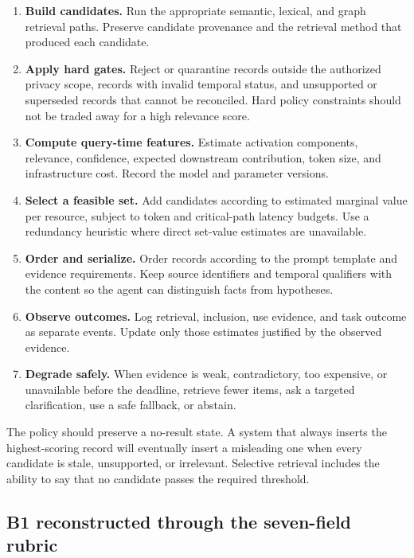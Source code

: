 \begin{enumerate}
  \item \textbf{Build candidates.} Run the appropriate semantic, lexical, and graph retrieval paths. Preserve candidate provenance and the retrieval method that produced each candidate.
  \item \textbf{Apply hard gates.} Reject or quarantine records outside the authorized privacy scope, records with invalid temporal status, and unsupported or superseded records that cannot be reconciled. Hard policy constraints should not be traded away for a high relevance score.
  \item \textbf{Compute query-time features.} Estimate activation components, relevance, confidence, expected downstream contribution, token size, and infrastructure cost. Record the model and parameter versions.
  \item \textbf{Select a feasible set.} Add candidates according to estimated marginal value per resource, subject to token and critical-path latency budgets. Use a redundancy heuristic where direct set-value estimates are unavailable.
  \item \textbf{Order and serialize.} Order records according to the prompt template and evidence requirements. Keep source identifiers and temporal qualifiers with the content so the agent can distinguish facts from hypotheses.
  \item \textbf{Observe outcomes.} Log retrieval, inclusion, use evidence, and task outcome as separate events. Update only those estimates justified by the observed evidence.
  \item \textbf{Degrade safely.} When evidence is weak, contradictory, too expensive, or unavailable before the deadline, retrieve fewer items, ask a targeted clarification, use a safe fallback, or abstain.
\end{enumerate}

The policy should preserve a no-result state. A system that always inserts the highest-scoring record will eventually insert a misleading one when every candidate is stale, unsupported, or irrelevant. Selective retrieval includes the ability to say that no candidate passes the required threshold.

\subsection{B1 reconstructed through the seven-field rubric}
\label{subsec:ch12-b1-seven-fields}

